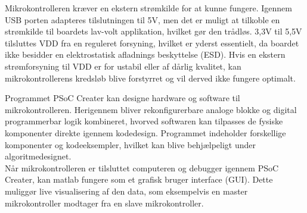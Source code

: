 Mikrokontrolleren kræver en ekstern strømkilde for at kunne fungere. Igennem USB porten adapteres tilslutningen til 5V, men det er muligt at tilkoble en strømkilde til boardets lav-volt applikation, hvilket gør den trådløs. 3,3V til 5,5V tilsluttes VDD fra en reguleret forsyning, hvilket er yderst essentielt, da boardet ikke besidder en elektrostatisk afladnings beskyttelse (ESD). Hvis en ekstern strømforsyning til VDD er for ustabil eller af dårlig kvalitet, kan mikrokontrollerens kredsløb blive forstyrret og vil derved ikke fungere optimalt. \citep{Semiconductor2016}

Programmet PSoC Creater kan designe hardware og software til mikrokontrolleren. Herigennem bliver rekonfigurerbare analoge blokke og digital programmerbar logik kombineret, hvorved softwaren kan tilpasses de fysiske komponenter direkte igennem kodedesign. Programmet indeholder forskellige komponenter og kodeeksempler, hvilket kan blive behjælpeligt under algoritmedesignet. \citep{Semiconductor2016} \\
Når mikrokontrolleren er tilsluttet computeren og debugger igennem PSoC Creater, kan matlab fungere som et grafisk bruger interface (GUI). Dette muliggør live visualisering af den data, som eksempelvis en master mikrokontroller modtager fra en slave mikrokontroller. 
%
%
%
